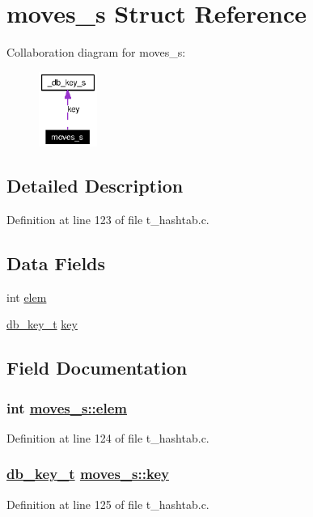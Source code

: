 \hypertarget{structmoves__s}{
\section{moves\_\-s Struct Reference}
\label{structmoves__s}
}
Collaboration diagram for moves\_\-s:\begin{figure}[H]
\begin{center}
\leavevmode
\includegraphics[width=54pt]{structmoves__s__coll__graph}
\end{center}
\end{figure}


\subsection{Detailed Description}




Definition at line 123 of file t\_\-hashtab.c.\subsection*{Data Fields}
\begin{CompactItemize}
\item 
int \hyperlink{structmoves__s_o0}{elem}
\item 
\hyperlink{struct__db__key__s}{db\_\-key\_\-t} \hyperlink{structmoves__s_o1}{key}
\end{CompactItemize}


\subsection{Field Documentation}
\hypertarget{structmoves__s_o0}{
\subsubsection[elem]{\setlength{\rightskip}{0pt plus 5cm}int \hyperlink{structmoves__s_o0}{moves\_\-s::elem}}}
\label{structmoves__s_o0}




Definition at line 124 of file t\_\-hashtab.c.\hypertarget{structmoves__s_o1}{
\subsubsection[key]{\setlength{\rightskip}{0pt plus 5cm}\hyperlink{struct__db__key__s}{db\_\-key\_\-t} \hyperlink{structmoves__s_o1}{moves\_\-s::key}}}
\label{structmoves__s_o1}




Definition at line 125 of file t\_\-hashtab.c.